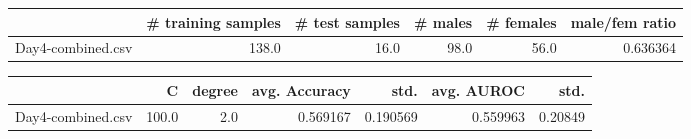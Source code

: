 \begin{tabular}{lrrrrr}
\hline
{} &  \# training samples &  \# test samples &  \# males &  \# females &  male/fem ratio \\
\hline
Day4-combined.csv &               138.0 &            16.0 &     98.0 &       56.0 &        0.636364 \\
\hline
\end{tabular}
\begin{tabular}{lrrrrrr}
\hline
{} &      C &  degree &  avg. Accuracy &      std. &  avg. AUROC &     std. \\
\hline
Day4-combined.csv &  100.0 &     2.0 &       0.569167 &  0.190569 &    0.559963 &  0.20849 \\
\hline
\end{tabular}
